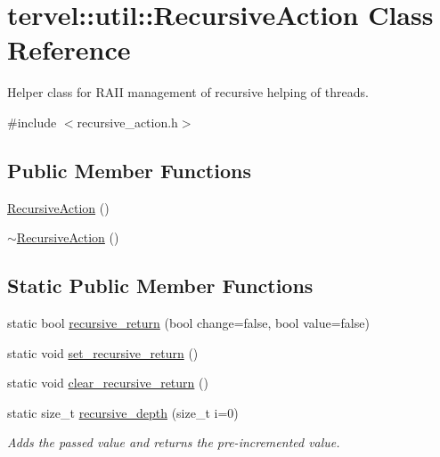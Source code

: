 \hypertarget{classtervel_1_1util_1_1_recursive_action}{}\section{tervel\+:\+:util\+:\+:Recursive\+Action Class Reference}
\label{classtervel_1_1util_1_1_recursive_action}


Helper class for R\+A\+I\+I management of recursive helping of threads.  




{\ttfamily \#include $<$recursive\+\_\+action.\+h$>$}

\subsection*{Public Member Functions}
\begin{DoxyCompactItemize}
\item 
\hyperlink{classtervel_1_1util_1_1_recursive_action_a9b933d52b081bc2bec138f44e035cfb4}{Recursive\+Action} ()
\item 
\hyperlink{classtervel_1_1util_1_1_recursive_action_aecf790a95c56d002498a74e7bf064ed4}{$\sim$\+Recursive\+Action} ()
\end{DoxyCompactItemize}
\subsection*{Static Public Member Functions}
\begin{DoxyCompactItemize}
\item 
static bool \hyperlink{classtervel_1_1util_1_1_recursive_action_a04517ab2addf5809dc3a3ac305043e59}{recursive\+\_\+return} (bool change=false, bool value=false)
\item 
static void \hyperlink{classtervel_1_1util_1_1_recursive_action_ad03949b4e1aad8fb562db5b3ea56633b}{set\+\_\+recursive\+\_\+return} ()
\item 
static void \hyperlink{classtervel_1_1util_1_1_recursive_action_aff53861114a7b16bad441839a1247f6f}{clear\+\_\+recursive\+\_\+return} ()
\item 
static size\+\_\+t \hyperlink{classtervel_1_1util_1_1_recursive_action_a003b6df6a071e6299e27ac16f8d0c8f2}{recursive\+\_\+depth} (size\+\_\+t i=0)
\begin{DoxyCompactList}\small\item\em Adds the passed value and returns the pre-\/incremented value. \end{DoxyCompactList}\end{DoxyCompactItemize}
